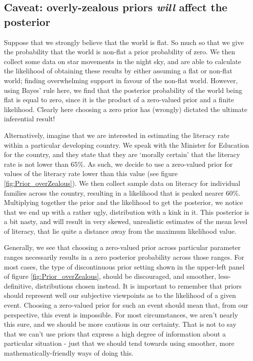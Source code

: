 \documentclass[11pt,fullpage]{book}
\begin{document}
\subsection{Caveat: overly-zealous priors \textit{will} affect the posterior}
Suppose that we strongly believe that the world is flat. So much so that we give the probability that the world is non-flat a prior probability of zero. We then collect some data on star movements in the night sky, and are able to calculate the likelihood of obtaining these results by either assuming a flat or non-flat world; finding overwhelming support in favour of the non-flat world. However, using Bayes' rule here, we find that the posterior probability of the world being flat is equal to zero, since it is the product of a zero-valued prior and a finite likelihood. Clearly here choosing a zero prior has (wrongly) dictated the ultimate inferential result!

Alternatively, imagine that we are interested in estimating the literacy rate within a particular developing country. We speak with the Minister for Education for the country, and they state that they are `morally certain' that the literacy rate is not lower than 65\%. As such, we decide to use a zero-valued prior for values of the literacy rate lower than this value (see figure \ref{fig:Prior_overZealous}). We then collect sample data on literacy for individual families across the country, resulting in a likelihood that is peaked nearer 60\%. Multiplying together the prior and the likelihood to get the posterior, we notice that we end up with a rather ugly, distribution with a kink in it. This posterior is a bit nasty, and will result in very skewed, unrealistic estimates of the mean level of literacy, that lie quite a distance away from the maximum likelihood value.

Generally, we see that choosing a zero-valued prior across particular parameter ranges necessarily results in a zero posterior probability across those ranges. For most cases, the type of discontinuous prior setting shown in the upper-left panel of figure \ref{fig:Prior_overZealous}, should be discouraged, and smoother, less-definitive, distributions chosen instead. It is important to remember that priors should represent well our subjective viewpoints as to the likelihood of a given event. Choosing a zero-valued prior for such an event should mean that, from our perspective, this event is impossible. For most circumstances, we aren't nearly this sure, and we should be more cautious in our certainty. That is not to say that we can't use priors that express a high degree of information about a particular situation - just that we should tend towards using smoother, more mathematically-friendly ways of doing this.
\end{document}
